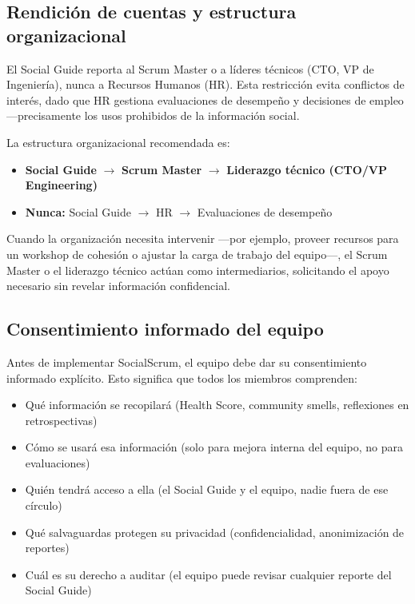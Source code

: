 \subsection{Rendición de cuentas y estructura organizacional}

El Social Guide reporta al Scrum Master o a líderes técnicos (CTO, VP de Ingeniería), nunca a Recursos Humanos (HR). Esta restricción evita conflictos de interés, dado que HR gestiona evaluaciones de desempeño y decisiones de empleo —precisamente los usos prohibidos de la información social.

La estructura organizacional recomendada es:

\begin{itemize}
    \item \textbf{Social Guide} $\rightarrow$ \textbf{Scrum Master} $\rightarrow$ \textbf{Liderazgo técnico (CTO/VP Engineering)}
    \item \textbf{Nunca:} Social Guide $\rightarrow$ HR $\rightarrow$ Evaluaciones de desempeño
\end{itemize}

Cuando la organización necesita intervenir —por ejemplo, proveer recursos para un workshop de cohesión o ajustar la carga de trabajo del equipo—, el Scrum Master o el liderazgo técnico actúan como intermediarios, solicitando el apoyo necesario sin revelar información confidencial.

\subsection{Consentimiento informado del equipo}

Antes de implementar SocialScrum, el equipo debe dar su consentimiento informado explícito. Esto significa que todos los miembros comprenden:

\begin{itemize}
    \item Qué información se recopilará (Health Score, community smells, reflexiones en retrospectivas)
    \item Cómo se usará esa información (solo para mejora interna del equipo, no para evaluaciones)
    \item Quién tendrá acceso a ella (el Social Guide y el equipo, nadie fuera de ese círculo)
    \item Qué salvaguardas protegen su privacidad (confidencialidad, anonimización de reportes)
    \item Cuál es su derecho a auditar (el equipo puede revisar cualquier reporte del Social Guide)
\end{itemize}

